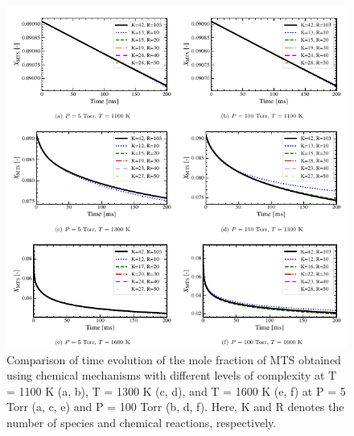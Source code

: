 \documentclass[final, letterpaper, square, comma, numbers, sort&compress]{elsarticle}
\begin{document}
\begin{figure}[p] %
    \centering\includegraphics[width=\textwidth]{ph-fig2.png}
\caption{Comparison of time evolution of the mole fraction of MTS obtained using chemical mechanisms with different levels of complexity at T = 1100 K (a, b), T = 1300 K (c, d), and T = 1600 K (e, f) at P = 5 Torr (a, c, e) and P = 100 Torr (b, d, f). Here, K and R denotes the number of species and chemical reactions, respectively.}
\label{T-vs-t-MTS}
\end{figure}
\end{document}
